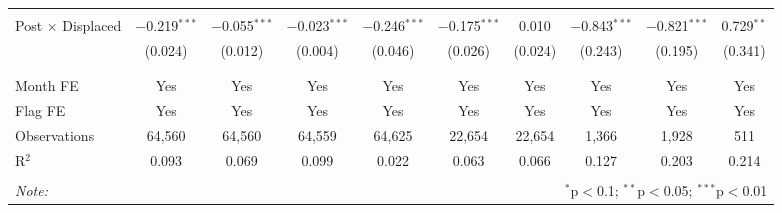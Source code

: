 \begin{table}[H]
\begin{tabular}{@{\extracolsep{1pt}}lccccccccc}
  & & & & & & & & & \\ 
 Post $\times$ Displaced & $-$0.219$^{***}$ & $-$0.055$^{***}$ & $-$0.023$^{***}$ & $-$0.246$^{***}$ & $-$0.175$^{***}$ & 0.010 & $-$0.843$^{***}$ & $-$0.821$^{***}$ & 0.729$^{**}$ \\ 
  & (0.024) & (0.012) & (0.004) & (0.046) & (0.026) & (0.024) & (0.243) & (0.195) & (0.341) \\ 
  & & & & & & & & & \\ 
\hline \\[-1.8ex] 
Month FE & Yes & Yes & Yes & Yes & Yes & Yes & Yes & Yes & Yes \\ 
Flag FE & Yes & Yes & Yes & Yes & Yes & Yes & Yes & Yes & Yes \\ 
Observations & 64,560 & 64,560 & 64,559 & 64,625 & 22,654 & 22,654 & 1,366 & 1,928 & 511 \\ 
R$^{2}$ & 0.093 & 0.069 & 0.099 & 0.022 & 0.063 & 0.066 & 0.127 & 0.203 & 0.214 \\ 
\hline 
\hline \\[-1.8ex] 
\textit{Note:}  & \multicolumn{9}{r}{$^{*}$p$<$0.1; $^{**}$p$<$0.05; $^{***}$p$<$0.01} \\ 
\end{tabular} 
\end{table} 
